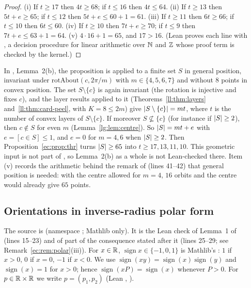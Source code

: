 \begin{proof}
(i) If $t\ge17$ then $4t\ge68$; if $t\le16$ then $4t\le64$. (ii) If $t\ge13$ then $5t+e\ge65$; if $t\le12$ then
$5t+e\le60+1=61$. (iii) If $t\ge11$ then $6t\ge66$; if $t\le10$ then $6t\le60$. (iv) If $t\ge10$ then $7t+e\ge70$; if
$t\le9$ then $7t+e\le63+1=64$. (v) $4\cdot16+1=65$, and $17>16$. (Lean proves each line with , a decision
procedure for linear arithmetic over $\mathbb N$ and $\mathbb Z$ whose proof term is checked by the kernel.)
\end{proof}

\begin{remark}\label{ec:rem:thr}
In , Lemma~2(b), the proposition is applied to a finite set $S$ in general position,
invariant under $\mathrm{rotAbout}(c,2\pi/m)$ with $m\in\{4,5,6,7\}$ and without $8$ points in convex position. The
set $S\setminus\{c\}$ is again invariant (the rotation is injective and fixes $c$), and the layer results applied to it
(Theorems~\ref{ll:thm:layers} and~\ref{ll:thm:card-peel}, with $K=8\le2m$) give $\lvert S\setminus\{c\}\rvert=mt$, where
$t$ is the number of convex layers of $S\setminus\{c\}$. If moreover $S\not\subseteq\{c\}$ (for instance if
$\lvert S\rvert\ge2$), then $c\notin S$ for even $m$ (Lemma~\ref{lg:lem:centre}). So $\lvert S\rvert=mt+e$ with $e=[c\in S]\le1$,
and $e=0$ for $m=4,6$ when $\lvert S\rvert\ge2$. Then Proposition~\ref{ec:prop:thr} turns $\lvert S\rvert\ge65$ into
$t\ge17,13,11,10$. This geometric input is not part of , so Lemma~2(b) as a whole is
not Lean-checked there. Item (v) records the arithmetic behind the
remark of  (lines 41--42) that general position is needed: with the centre allowed for
$m=4$, $16$ orbits and the centre would already give $65$ points.
\end{remark}

\subsection{Orientations in inverse-radius polar form}\label{ec:ssec:polar}

The source is  (namespace ; Mathlib only). It is the Lean check of
Lemma~1 of  (lines 15--23) and of part of the consequence stated after it (lines 25--29;
see Remark~\ref{ec:rem:polar}(iii)). For $x\in\mathbb R$, $\operatorname{sign}x\in\{-1,0,1\}$ is
Mathlib's : $1$ if $x>0$, $0$ if $x=0$, $-1$ if $x<0$. We use
$\operatorname{sign}(xy)=\operatorname{sign}(x)\operatorname{sign}(y)$ and $\operatorname{sign}(x)=1$ for $x>0$; hence
$\operatorname{sign}(xP)=\operatorname{sign}(x)$ whenever $P>0$. For $p\in\mathbb R\times\mathbb R$ we write $p=(p_1,p_2)$ (Lean
, ).

